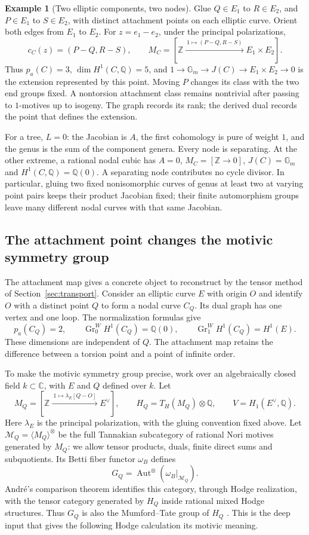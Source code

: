 \documentclass[11pt]{article}
\theoremstyle{definition}
\newtheorem{example}[theorem]{Example}
\theoremstyle{remark}
\newcommand{\Q}{\mathbb Q}
\newcommand{\Z}{\mathbb Z}
\newcommand{\C}{\mathbb C}
\begin{document}
\begin{example}[Two elliptic components, two nodes]
Glue $Q\in E_1$ to $R\in E_2$, and $P\in E_1$ to $S\in E_2$, with
distinct attachment points on each elliptic curve. Orient both edges from
$E_1$ to $E_2$. For $z=e_1-e_2$, under the principal polarizations,
\[
 c_C(z)=(P-Q,R-S),\qquad
 M_C=[\Z\xrightarrow{\ 1\mapsto(P-Q,R-S)\ }E_1\times E_2].
\]
Thus $p_a(C)=3$, $\dim H^1(C,\Q)=5$, and
$1\to\mathbb G_m\to J(C)\to E_1\times E_2\to0$ is the extension
represented by this point. Moving $P$ changes its class with the two
end groups fixed. A nontorsion attachment class remains nontrivial after
passing to $1$-motives up to isogeny. The graph records its rank; the
derived dual records the point that defines the extension.
\end{example}

For a tree, $L=0$: the Jacobian is $A$, the first cohomology is pure of
weight $1$, and the genus is the sum of the component genera. Every node
is separating. At the other extreme, a rational nodal cubic has $A=0$,
$M_C=[\Z\to0]$, $J(C)=\mathbb G_m$ and $H^1(C,\Q)=\Q(0)$.
A separating node contributes no cycle divisor. In particular, gluing
two fixed nonisomorphic curves of genus at least two at varying point
pairs keeps their product Jacobian fixed; their finite automorphism
groups leave many different nodal curves with that same Jacobian.

\subsection{The attachment point changes the motivic symmetry group}
\label{sec:galois-attachment}

The attachment map gives a concrete object to reconstruct by the tensor
method of Section~\ref{sec:transport}. Consider an elliptic curve $E$
with origin $O$ and identify $O$ with a distinct point $Q$ to form a
nodal curve $C_Q$. Its dual graph has one vertex and one loop.
The normalization formulas give
\[
 p_a(C_Q)=2,\qquad
 \operatorname{Gr}^W_0H^1(C_Q)=\Q(0),\qquad
 \operatorname{Gr}^W_1H^1(C_Q)=H^1(E).
\]
These dimensions are independent of $Q$. The attachment map retains the
difference between a torsion point and a point of infinite order.

To make the motivic symmetry group precise, work over an algebraically
closed field $k\subset\C$, with $E$ and $Q$ defined over $k$. Let
\[
 M_Q=[\Z\xrightarrow{\ 1\mapsto\lambda_E[Q-O]\ }E^\vee],
 \qquad H_Q=T_H(M_Q)\otimes\Q,\qquad V=H_1(E^\vee,\Q).
\]
Here $\lambda_E$ is the principal polarization, with the gluing convention
fixed above. Let $\mathcal M_Q=\langle M_Q\rangle^\otimes$ be the full
Tannakian subcategory of rational Nori motives generated by $M_Q$:
we allow tensor products, duals, finite direct sums and subquotients.
Its Betti fiber functor $\omega_B$ defines
\[
 G_Q=\operatorname{Aut}^\otimes(\omega_B|_{\mathcal M_Q}).
\]
Andr\'e's comparison theorem identifies this category, through Hodge
realization, with the tensor category generated by $H_Q$ inside rational
mixed Hodge structures. Thus $G_Q$ is also the Mumford--Tate group of
$H_Q$ \cite[Theorem 1.2.1]{galoisAndreOneMotives}. This is the deep input
that gives the following Hodge calculation its motivic meaning.
\end{document}
